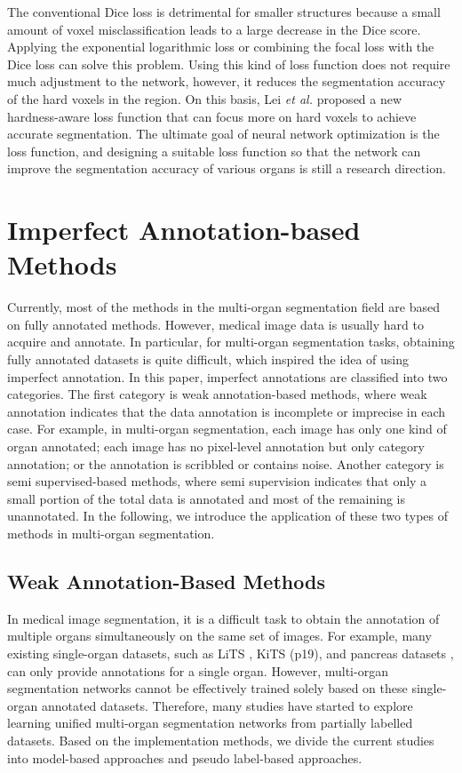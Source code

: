 \documentclass[lettersize,journal]{IEEEtran}
\begin{document}
The conventional Dice loss is detrimental for smaller structures because a small amount of voxel misclassification leads to a large decrease in the Dice score. Applying the exponential logarithmic loss or combining the focal loss with the Dice loss can solve this problem. Using this kind of loss function does not require much adjustment to the network, however, it reduces the segmentation accuracy of the hard voxels in the region. On this basis, Lei {\it{et al.}} \cite{47} proposed a new hardness-aware loss function that can focus more on hard voxels to achieve accurate segmentation. The ultimate goal of neural network optimization is the loss function, and designing a suitable loss function so that the network can improve the segmentation accuracy of various organs is still a research direction.

\section{Imperfect Annotation-based Methods}
\label{sec5}
Currently, most of the methods in the multi-organ segmentation field are based on fully annotated methods. However, medical image data is usually hard to acquire and annotate. In particular, for multi-organ segmentation tasks, obtaining fully annotated datasets is quite difficult, which inspired the idea of using imperfect annotation. In this paper, imperfect annotations are classified into two categories. The first category is weak annotation-based methods, where weak annotation indicates that the data annotation is incomplete or imprecise in each case. For example, in multi-organ segmentation, each image has only one kind of organ annotated; each image has no pixel-level annotation but only category annotation; or the annotation is scribbled or contains noise. Another category is semi supervised-based methods, where semi supervision indicates that only a small portion of the total data is annotated and most of the remaining is unannotated. In the following, we introduce the application of these two types of methods in multi-organ segmentation.

\subsection{Weak Annotation-Based Methods}
\label{sec5_1}
In medical image segmentation, it is a difficult task to obtain the annotation of multiple organs simultaneously on the same set of images. For example, many existing single-organ datasets, such as LiTS \cite{185}, KiTS \cite{186} (p19), and pancreas datasets \cite{187}, can only provide annotations for a single organ. However, multi-organ segmentation networks cannot be effectively trained solely based on these single-organ annotated datasets. Therefore, many studies have started to explore learning unified multi-organ segmentation networks from partially labelled datasets. Based on the implementation methods, we divide the current studies into model-based approaches and pseudo label-based approaches.
\end{document}
